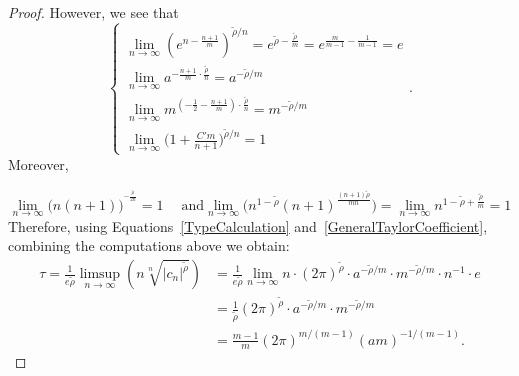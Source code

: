 \documentclass[graybox]{svmult}
\begin{document}
\begin{proof}
However, we see that 
$$\begin{cases}  \lim_{n\to \infty}(e^{n - \frac{n+1}{m}})^{\tilde{\rho}/n} = e^{\tilde{\rho}- \frac{\tilde{\rho}}{m}} = e^{\frac{m}{m-1} - \frac{1}{m-1}}=e\\
\lim_{n\to \infty} a^{-\frac{n+1}{m}\cdot \frac{\tilde{\rho}}{n}} = a^{-\tilde{\rho}/m}\\\lim_{n\to\infty}m ^{(-\frac{1}{2}-\frac{n+1}{m})\cdot \frac{\tilde{\rho}}{n}} = m^{-\tilde{\rho}/m}\\
\lim_{n\to \infty}\Big(1 + \frac{C'm}{n+1}\Big)^{\tilde{\rho}/n} =1\end{cases}.$$ Moreover,


$$\lim_{n\to \infty}\Big( n(n+1) \Big)^{^{-\frac{\tilde{\rho}}{2n}}} = 1 \;\quad \text{and} \lim_{n\to \infty}\Big(n^{1-\tilde{\rho}}(n+1)^{\frac{(n+1)\tilde{\rho}}{mn}}\Big)=\lim_{n\to \infty} n^{1-\tilde{\rho}+\frac{\tilde{\rho}}{m}}= 1$$
Therefore, using Equations~\eqref{TypeCalculation} and~\eqref{GeneralTaylorCoefficient}, combining the computations above we obtain: 
\begin{align*}
    \tau = \frac{1}{e\tilde{\rho}} \limsup_{n \to\infty} (n \sqrt[n]{|c_n|^{\tilde{\rho}}}) &= \frac{1}{e\tilde{\rho}}\lim_{n\to\infty}n\cdot(2\pi)^{\tilde{\rho}}\cdot a^{-\tilde{\rho}/m}\cdot m^{-\tilde{\rho}/m}\cdot n^{-1}\cdot e\\ 
    &= \frac{1}{\tilde{\rho}}  (2\pi)^{\tilde{\rho}}\cdot a^{-\tilde{\rho}/m}\cdot m^{-\tilde{\rho}/m}\\
    &= \frac{m-1}{m}(2\pi)^{m/(m-1)}(am)^{-1/(m-1)}.
\end{align*}
\end{proof}
\end{document}
